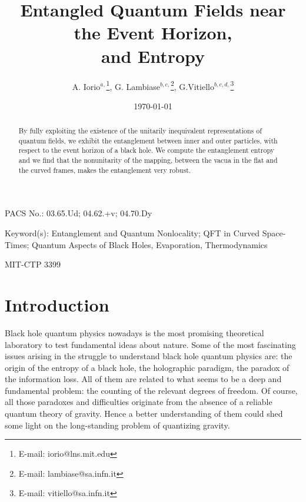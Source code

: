  \title{Entangled Quantum Fields near the Event Horizon, \\
 and Entropy}
 \author{A. Iorio$^{a,}$\thanks{E-mail: iorio@lns.mit.edu},
 G. Lambiase$^{b,c,}$\thanks{E-mail: lambiase@sa.infn.it},
 G.Vitiello$^{b,c,d,}$\thanks{E-mail: vitiello@sa.infn.it} }
  \address{$^a$ Center for Theoretical Physics, Massachusetts Institute of Technology, \\
   Cambridge, MA 02139-4307, USA  \\
   and INFN, Rome, Italy}
  \address{$^b$Dipartimento di Fisica "E.R.Caianiello"
  Universit\`a di Salerno, 84081 Baronissi (SA), Italy}
  \address{$^c$INFN, Gruppo Collegato di Salerno}
  \address{$^d$INFM, Salerno, Italy}
 \date{\today}
 \begin{abstract}
 By fully exploiting the existence of the unitarily
inequivalent representations of quantum fields, we exhibit the
entanglement between inner and outer particles, with respect to
the event horizon of a black hole. We compute the entanglement
entropy and we find that the nonunitarity of the mapping, between
the vacua in the flat and the curved frames, makes the
entanglement very robust.
\end{abstract}

\maketitle

\bigskip
\bigskip

 PACS No.: 03.65.Ud; 04.62.+v; 04.70.Dy

 Keyword(s): Entanglement and Quantum Nonlocality; QFT in
Curved Space-Times; Quantum Aspects of Black Holes, Evaporation,
Thermodynamics

\vfill

MIT-CTP 3399

\newpage

\section{Introduction}
\setcounter{equation}{0}

 Black hole quantum physics nowadays is the most
promising theoretical laboratory to test fundamental ideas about
nature. Some of the most fascinating issues arising in the
struggle to understand black hole quantum physics are:  the origin
of the entropy of a black hole, the holographic paradigm, the
paradox of the information loss. All of them are related to what
seems to be a deep and fundamental problem: the counting of the
relevant degrees of freedom. Of course, all those paradoxes and
difficulties originate from the absence of a reliable quantum
theory of gravity. Hence a better understanding of them could shed
some light on the long-standing problem of quantizing gravity.

